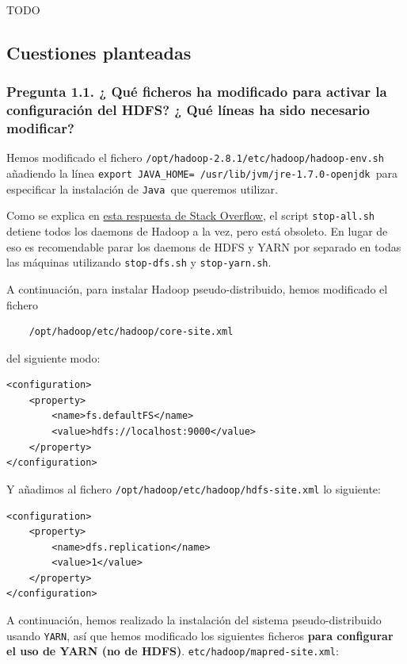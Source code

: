 \documentclass[11pt]{article}
\def\inline{\lstinline[basicstyle=\ttfamily,keywordstyle={}]}
\begin{document}
TODO







\subsection{ Cuestiones planteadas}

\subsubsection*{ Pregunta 1.1. ¿ Qué ficheros ha modificado para activar la configuración del HDFS? ¿ Qué líneas ha sido necesario modificar?}

Hemos modificado el fichero \inline{/opt/hadoop-2.8.1/etc/hadoop/hadoop-env.sh }añadiendo la línea \inline{export JAVA_HOME= /usr/lib/jvm/jre-1.7.0-openjdk }para especificar la instalación de \inline{Java }que queremos utilizar.


Como se explica en  \href{https://stackoverflow.com/questions/17569423/what-is-best-way-to-start-and-stop-hadoop-ecosystem-with-command-line}{esta respuesta de Stack Overflow}, el script \inline{stop-all.sh }detiene todos los daemons de Hadoop a la vez, pero está obsoleto. En lugar de eso es recomendable parar los daemons de HDFS y YARN por separado en todas las máquinas utilizando \inline|stop-dfs.sh| y  \inline{stop-yarn.sh}.

A continuación, para instalar Hadoop pseudo-distribuido, hemos modificado el fichero 
\begin{verbatim} 
    /opt/hadoop/etc/hadoop/core-site.xml
\end{verbatim}
del siguiente modo:


\begin{verbatim}
<configuration>
    <property>
        <name>fs.defaultFS</name>
        <value>hdfs://localhost:9000</value>
    </property>
</configuration>
\end{verbatim}


Y añadimos al fichero  \inline{/opt/hadoop/etc/hadoop/hdfs-site.xml} lo siguiente:
\begin{verbatim}
<configuration>
    <property>
        <name>dfs.replication</name>
        <value>1</value>
    </property>
</configuration>
\end{verbatim}

A continuación, hemos realizado la instalación del sistema pseudo-distribuido usando  \inline{YARN}, así que hemos modificado los siguientes ficheros \textbf{para configurar el uso de YARN (no de HDFS)}.  \inline{etc/hadoop/mapred-site.xml}:
\end{document}
